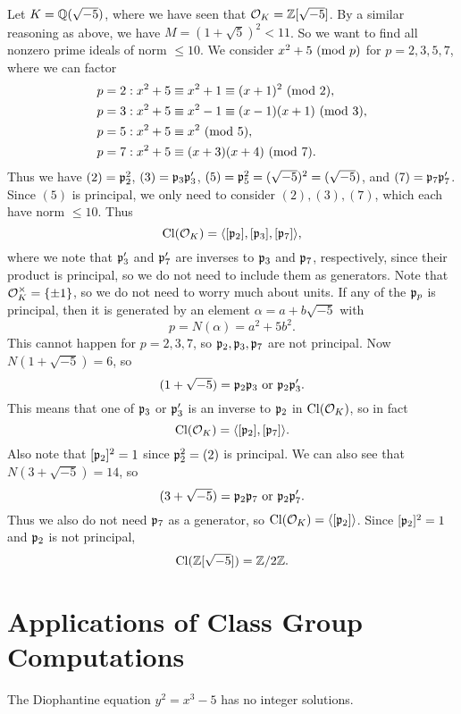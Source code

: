 \begin{example}
  Let $K = \mathbb{Q}(\sqrt{-5})$, where we have
  seen that $\mathcal{O}_K = \mathbb{Z}[\sqrt{-5}]$. By a similar
  reasoning as above, we have
  $M = (1 + \sqrt{5})^2 < 11$. So we want to find
  all nonzero prime ideals of norm $\le 10$. We consider
  $x^2 + 5 \ (\mathrm{mod}\ p)$ for $p = 2, 3, 5, 7$, where
  we can factor
  \begin{align*}
    p = 2 & : x^2 + 5 \equiv x^2 + 1 \equiv (x + 1)^2 \ (\mathrm{mod}\ 2), \\
    p = 3 & : x^2 + 5 \equiv x^2 - 1 \equiv (x - 1)(x + 1) \ (\mathrm{mod}\ 3), \\
    p = 5 & : x^2 + 5 \equiv x^2 \ (\mathrm{mod}\ 5), \\
    p = 7 & : x^2 + 5 \equiv (x + 3)(x + 4) \ (\mathrm{mod}\ 7).
  \end{align*}
  Thus we have
  $(2) = \mathfrak{p}_2^2$, $(3) = \mathfrak{p}_3 \mathfrak{p}_3'$, $(5) = \mathfrak{p}_5^2 = (\sqrt{-5})^2 = (\sqrt{-5})$,
  and $(7) = \mathfrak{p}_7 \mathfrak{p}_7'$. Since $(5)$ is principal,
  we only need to consider $(2), (3), (7)$, which
  each have norm $\le 10$. Thus
  \[
    \operatorname{Cl}(\mathcal{O}_K) = \langle [\mathfrak{p}_2], [\mathfrak{p}_3], [\mathfrak{p}_7] \rangle,
  \]
  where we note that $\mathfrak{p}_3'$ and $\mathfrak{p}_7'$
  are inverses to $\mathfrak{p}_3$ and $\mathfrak{p}_7$, respectively,
  since their product is principal, so we do not
  need to include them as generators.
  Note that $\mathcal{O}_K^\times = \{\pm 1\}$, so we do
  not need to worry much about units. If
  any of the $\mathfrak{p}_p$ is principal, then it is generated
  by an element $\alpha = a + b\sqrt{-5}$ with
  \[
    p = N(\alpha) = a^2 + 5b^2.
  \]
  This cannot happen for $p = 2, 3, 7$, so
  $\mathfrak{p}_2, \mathfrak{p}_3, \mathfrak{p}_7$ are not principal. Now
  $N(1 + \sqrt{-5}) = 6$, so
  \[
    (1 + \sqrt{-5}) = \mathfrak{p}_2 \mathfrak{p}_3 \text{ or } \mathfrak{p}_2 \mathfrak{p}_3'.
  \]
  This means that one of $\mathfrak{p}_3$ or $\mathfrak{p}_3'$ is an
  inverse to $\mathfrak{p}_2$ in $\operatorname{Cl}(\mathcal{O}_K)$, so in fact
  \[
    \operatorname{Cl}(\mathcal{O}_K) = \langle [\mathfrak{p}_2], [\mathfrak{p}_7] \rangle.
  \]
  Also note that $[\mathfrak{p}_2]^2 = 1$ since $\mathfrak{p}_2^2 = (2)$
  is principal. We can also see that
  $N(3 + \sqrt{-5}) = 14$, so
  \[
    (3 + \sqrt{-5}) = \mathfrak{p}_2 \mathfrak{p}_7 \text{ or } \mathfrak{p}_2 \mathfrak{p}_7'.
  \]
  Thus we also do not need $\mathfrak{p}_7$ as a generator, so
  $\operatorname{Cl}(\mathcal{O}_K) = \langle [\mathfrak{p}_2] \rangle$. Since
  $[\mathfrak{p}_2]^2 = 1$ and $\mathfrak{p}_2$ is not principal,
  \[
    \operatorname{Cl}(\mathbb{Z}[\sqrt{-5}]) = \mathbb{Z} / 2\mathbb{Z}.
  \]
\end{example}

\section{Applications of Class Group Computations}

\begin{theorem}
  The Diophantine equation $y^2 = x^3 - 5$ has
  no integer solutions.
\end{theorem}

